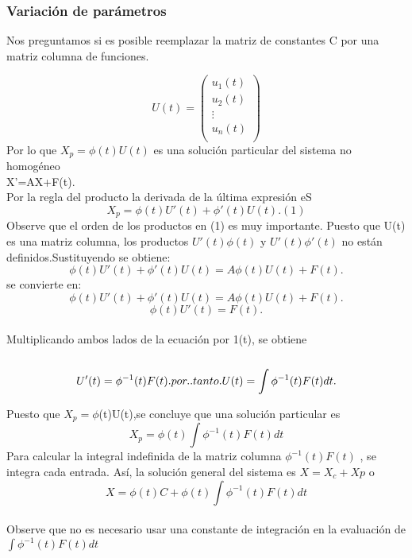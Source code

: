 \documentclass[11.5pt]{article}
\begin{document}
\subsubsection*{Variación de parámetros}
Nos preguntamos si es posible reemplazar la matriz de constantes C  por una
matriz columna de funciones.

$$U(t)=\begin{pmatrix}
u_1(t)\\
u_2(t)\\
\vdots\\
u_n(t)\\
\end{pmatrix}$$
Por lo que $X_p=\phi(t)U(t)$ es una solución particular del sistema no homogéneo\\
X'=AX+F(t).\\
Por la regla del producto la derivada de la última expresión eS\\
$$X_p =\phi(t)U'(t)+\phi'(t)U(t). (1)$$
Observe que el orden de los productos en (1) es muy importante. Puesto que U(t) es una
matriz columna, los productos $U'(t)\phi(t)$ y $U'(t)\phi'(t)$ no están definidos.Sustituyendo se obtiene:\\
$$\phi(t)U'(t)+\phi'(t)U(t)= A\phi(t)U(t)+F(t).$$
 se convierte en:\\
 $$\phi(t)U'(t)+\phi'(t)U(t)= A\phi(t)U(t)+F(t).$$
$$\phi(t)U'(t)=F(t).$$
\vspace{0.1cm}\\
Multiplicando ambos lados de la ecuación  por 1(t), se obtiene\\
\vspace{0.1cm}\\
\begin{equation}
U'(t) =\phi ^{-1}(t)F(t). por.. tanto. U(t) =\int \phi^{-1}(t)F(t)dt.\\
\end{equation}  

Puesto que $X_p=\phi$(t)U(t),se concluye que una solución particular es\\
$$X_p=\phi(t)\int \phi^{-1}(t)F(t)dt$$
Para calcular la integral indefinida de la matriz columna $ \phi ^{-1}(t)F(t)$ , se integra cada entrada. Así, la solución general del sistema es  $X = X_c + Xp$ o\\
$$X =\phi( t)C +\phi(t)\int \phi^{-1}(t)F(t)dt$$\\
Observe que no es necesario usar una constante de integración en la evaluación de
$\int \phi ^{-1}(t)F(t)dt$\\
\end{document}
